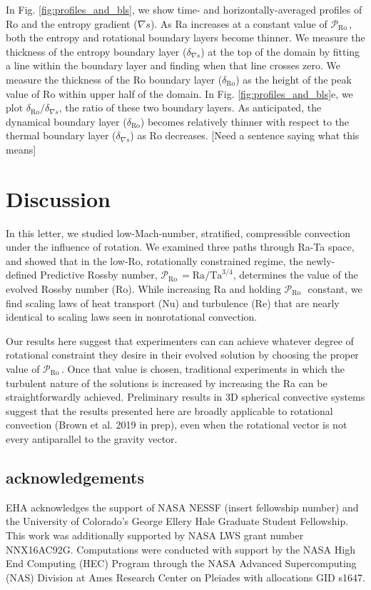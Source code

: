 \documentclass[twocolumn, amsmath, amsfonts, amssymb]{aastex62}
\newcommand{\grad}{\ensuremath{\nabla}}
\newcommand{\pro}{\ensuremath{\mathcal{P}_{\text{Ro}}\,}}
\begin{document}
In Fig. \ref{fig:profiles_and_bls}, we show time- and horizontally-averaged profiles of
Ro and the entropy gradient ($\grad s$). As Ra increases at a constant value of
\pro, both the entropy and rotational boundary layers become thinner. We measure the
thickness of the entropy boundary layer ($\delta_{\grad s}$) at the top of the domain by 
fitting a line within the boundary layer and finding when that line crosses zero. We measure
the thickness of the Ro boundary layer ($\delta_{\text{Ro}}$) 
as the height of the peak value of Ro within 
upper half of the domain.
In Fig. \ref{fig:profiles_and_bls}e, we plot $\delta_{\text{Ro}}/\delta_{\grad s}$, the ratio
of these two boundary layers. As anticipated, the dynamical boundary layer ($\delta_{\text{Ro}}$)
becomes relatively thinner with respect to the thermal boundary layer ($\delta_{\grad s}$)
as Ro decreases. [Need a sentence saying what this means]

\section{Discussion}
\label{sec:discussion}
In this letter, we studied low-Mach-number, stratified, compressible convection 
under the influence of rotation.
We examined three paths through Ra-Ta space, and showed that in the low-Ro, rotationally
constrained regime, the newly-defined 
Predictive Rossby number, $\pro = \text{Ra}/\text{Ta}^{3/4}$, determines the value of
the evolved Rossby number (Ro). While increasing Ra and holding \pro$\,$ constant,
we find scaling laws of heat transport (Nu) and turbulence (Re) that are nearly identical
to scaling laws seen in nonrotational convection.

Our results here suggest that experimenters can
can achieve whatever degree of rotational constraint they desire in their evolved solution
by choosing the proper value of \pro. Once that value is chosen, traditional experiments
in which the turbulent nature of the solutions is increased by increasing the Ra can be 
straightforwardly achieved. Preliminary results in 3D spherical convective systems suggest
that the results presented here are broadly applicable to rotational convection 
(Brown et al. 2019 in prep), even when the rotational vector is not every antiparallel to the
gravity vector.


\subsection{acknowledgements}
EHA acknowledges the support of NASA NESSF (insert fellowship number)
and the University of Colorado's George 
Ellery Hale Graduate Student Fellowship.
This work was additionally supported by  NASA LWS grant number NNX16AC92G.  
Computations were conducted 
with support by the NASA High End Computing (HEC) Program through the NASA 
Advanced Supercomputing (NAS) Division at Ames Research Center on Pleiades
with allocations GID s1647.

\newpage

\end{document}

